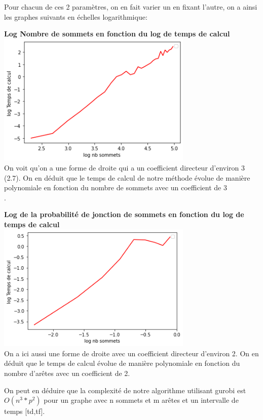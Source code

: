 \documentclass{article}
\begin{document}
Pour chacun de ces 2 paramètres, on en fait varier un en fixant l'autre, on a ainsi les graphes suivants en échelles logarithmique:\\
\newpage
\begin{center}
\textbf{Log Nombre de sommets en fonction du log de temps de calcul\\}
\includegraphics[width=0.7\textwidth]{dsommets.png}\\
On voit qu'on a une forme de droite qui a un coefficient directeur d'environ 3 (2.7). On en déduit que le temps de calcul de notre méthode évolue de manière polynomiale en fonction du nombre de sommets avec un coefficient de 3\\.

\textbf{Log de la probabilité de jonction de sommets en fonction du log de temps de calcul\\}
\includegraphics[width=0.7\textwidth]{daretes.png}\\
On a ici aussi une forme de droite avec un coefficient directeur d'environ 2. On en déduit que le temps de calcul évolue de manière polynomiale en fonction du nombre d'arêtes avec un coefficient de 2.\\
\end{center}
On peut en déduire que la complexité de notre algorithme utilisant gurobi est $ O(n^{3}*p^{2}) $ pour un graphe avec n sommets et m arêtes et un intervalle de temps [td,tf].
\end{document}
